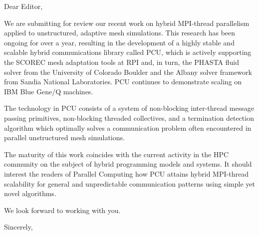 \documentclass{letter}
\begin{document}
\begin{letter}{}
\opening{Dear Editor,}

We are submitting for review our recent work on hybrid MPI-thread parallelism
applied to unstructured, adaptive mesh simulations.
This research has been ongoing for over a year, resulting in the development
of a highly stable and scalable hybrid communications library called PCU, which is actively
supporting the SCOREC mesh adaptation tools at RPI and, in turn, the PHASTA fluid solver
from the University of Colorado Boulder
and the Albany solver framework from Sandia National Laboratories.
PCU continues to demonstrate scaling on IBM Blue Gene/Q machines.

The technology in PCU consists of a system of non-blocking inter-thread message
passing primitives, non-blocking threaded collectives, and a termination
detection algorithm which optimally solves a communication problem often
encountered in parallel unstructured mesh simulations.

The maturity of this work coincides with the current activity in the HPC
community on the subject of hybrid programming models and systems.
It should interest the readers of Parallel Computing how PCU attains
hybrid MPI-thread
scalability for general and unpredictable communication patterns using
simple yet novel algorithms.

We look forward to working with you.

\closing{Sincerely,}
\end{letter}
\end{document}
